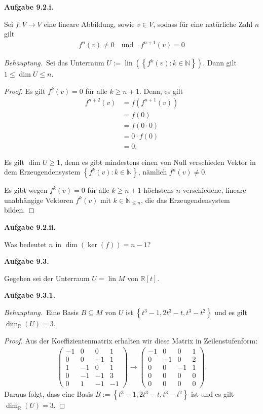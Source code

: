 \documentclass[12pt]{extarticle}
\newcommand{\mg}[1]{\mathbb{#1}}
\newcommand{\lin}{\operatorname{lin}}
\newcommand{\aufgn}[1]{\textbf{Aufgabe #1.}}
\newcommand{\beh}{\textit{Behauptung.}\ }
\begin{document}
\aufgn{9.2.i}

Sei \(f \colon V \to V\) eine lineare Abbildung, sowie \(v \in V\), sodass
für eine natürliche Zahl \(n\) gilt
\begin{align*}
f^n(v) \ne 0 \quad \text{und} \quad f^{n+1}(v) = 0
\end{align*}

\beh Sei das Unterraum
$U := \lin \left( \left\{ f^k(v) \colon k \in
    \mg{N}\right\} \right)$.  Dann gilt
\( 1 \leq \dim U \leq n\).

\begin{proof}
Es gilt \(f^k(v) = 0\) für alle \(k \geq n + 1\).  Denn, es
gilt
\begin{align*}
  f^{n+2}(v) &= f \left( f^{n+1}(v) \right) \\
             &= f (0) \\
             &= f(0 \cdot 0)\\
             &= 0 \cdot f(0)\\
             &= 0.
\end{align*}

Es gilt \(\dim U \geq 1\), denn es gibt mindestens einen
von Null verschieden Vektor in dem Erzeugendensystem
\(\left\{ f^k(v) \colon k \in \mg{N}\right\}\), nämlich
\(f^n(v) \ne 0\).

Es gibt wegen  \(f^k(v) = 0\) für alle \(k \geq n + 1\)
höchstens \(n\) verschiedene, lineare unabhängige
Vektoren \(f^k(v)\) mit \(k \in \mg{N}_{\leq n}\), die das
Erzeugendensystem bilden.
\end{proof}

\aufgn{9.2.ii}

Was bedeutet \(n\) in \(\dim(\ker(f))=n-1\)?

\aufgn{9.3}

Gegeben sei der Unterraum \(U = \lin M\) von \(\mg{R}[t]\).

\aufgn{9.3.1}

\beh Eine Basis \(B \subseteq M\) von \(U\) ist $\left\{
  t^3 - 1, 2t^3 - t, t^3 - t^2 \right\}$
und es gilt \(\dim_{\mg{R}}(U) = 3\).

\begin{proof}
  Aus der Koeffizientenmatrix erhalten wir diese Matrix
  in Zeilenstufenform:
\begin{align*}
\begin{pmatrix}
  -1 & 0 & 0 & 1 \\
  0 & 0 & -1 & 1 \\
  1 & -1 & 0 & 1 \\
  0 & -1 & -1 & 3 \\
  0 & 1 & -1 & -1
\end{pmatrix} \to
\begin{pmatrix}
  -1 & 0 & 0 & 1\\
  0 & -1 & 0 & 2\\
  0 & 0 & -1 & 1\\
  0 & 0 & 0 & 0 \\
  0 & 0 & 0 & 0
\end{pmatrix}.
\end{align*}
Daraus folgt, dass eine Basis $B := \left\{
  t^3 - 1, 2t^3 - t, t^3 - t^2 \right\}$ ist
und es gilt \(\dim_{\mg{R}}(U) = 3\).
\end{proof}
\end{document}
